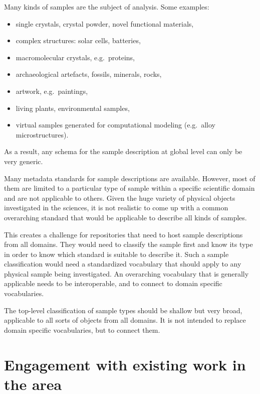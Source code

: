 \documentclass{scrartcl}
\begin{document}
Many kinds of samples are the subject of analysis. Some examples:
\begin{itemize}
\item single crystals, crystal powder, novel functional materials,
\item complex structures: solar cells, batteries,
\item macromolecular crystals, e.g.\ proteins,
\item archaeological artefacts, fossils, minerals, rocks,
\item artwork, e.g.\ paintings,
\item living plants, environmental samples,
\item virtual samples generated for computational modeling (e.g.\
  alloy microstructures).
\end{itemize}

As a result, any schema for the sample description at global level can
only be very generic.

Many metadata standards for sample descriptions are available.
However, most of them are limited to a particular type of sample
within a specific scientific domain and are not applicable to others.
Given the huge variety of physical objects investigated in the
sciences, it is not realistic to come up with a common overarching
standard that would be applicable to describe all kinds of samples.

This creates a challenge for repositories that need to host sample
descriptions from all domains.  They would need to classify the sample
first and know its type in order to know which standard is suitable to
describe it.  Such a sample classification would need a standardized
vocabulary that should apply to any physical sample being
investigated.  An overarching vocabulary that is generally applicable
needs to be interoperable, and to connect to domain specific
vocabularies.

The top-level classification of sample types should be shallow but
very broad, applicable to all sorts of objects from all domains.  It
is not intended to replace domain specific vocabularies, but to
connect them.

\section{Engagement with existing work in the area}
\end{document}
